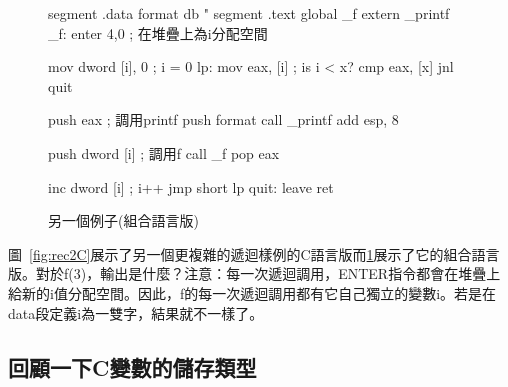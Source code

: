 \begin{figure}
\begin{AsmCodeListing}[frame=single]
segment .data
format       db "%
segment .text
      global _f
      extern _printf
_f:
      enter  4,0           ; 在堆疊上為i分配空間

      mov    dword [i], 0  ; i = 0
lp:
      mov    eax, [i]      ; is i < x?
      cmp    eax, [x]
      jnl    quit

      push   eax           ; 調用printf
      push   format
      call   _printf
      add    esp, 8

      push   dword [i]     ; 調用f
      call   _f
      pop    eax

      inc    dword [i]     ; i++
      jmp    short lp
quit:
      leave
      ret
\end{AsmCodeListing}
\caption{另一個例子(組合語言版)\label{fig:rec2Asm}}
\end{figure}

圖~\ref{fig:rec2C}展示了另一個更複雜的遞迴樣例的C語言版而\ref{fig:rec2Asm}展示了它的組合語言版。對於{\code f(3)}，輸出是什麼？注意：每一次遞迴調用，{\code ENTER}指令都會在堆疊上給新的{\code i}值分配空間。因此，{\code f}的每一次遞迴調用都有它自己獨立的變數{\code i}。若是在{\code data}段定義{\code i}為一雙字，結果就不一樣了。

\subsection{回顧一下C變數的儲存類型}

